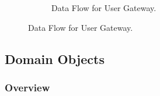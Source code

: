 \documentclass[12pt]{article}
\begin{document}
\begin{figure}
\begin{subfigure}[p]{0.47\textwidth}
\centering	
{}
\caption{Data Flow for User Gateway.}
\end{subfigure}


\end{figure}
\vspace{0.2in}
\newpage
\subsection{Domain Objects}
\subsubsection{Overview}
\end{document}
